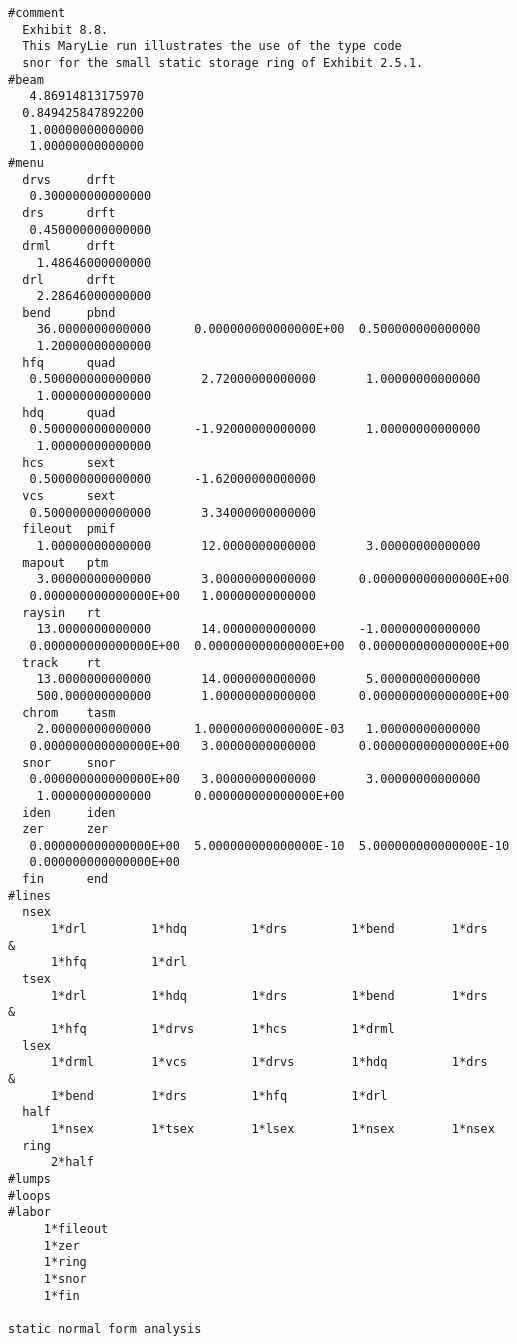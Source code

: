 \vspace{5mm}
\begin{footnotesize}
\begin{verbatim}
#comment
  Exhibit 8.8.
  This MaryLie run illustrates the use of the type code
  snor for the small static storage ring of Exhibit 2.5.1.
#beam
   4.86914813175970
  0.849425847892200
   1.00000000000000
   1.00000000000000
#menu
  drvs     drft
   0.300000000000000
  drs      drft
   0.450000000000000
  drml     drft
    1.48646000000000
  drl      drft
    2.28646000000000
  bend     pbnd
    36.0000000000000      0.000000000000000E+00  0.500000000000000
    1.20000000000000
  hfq      quad
   0.500000000000000       2.72000000000000       1.00000000000000
    1.00000000000000
  hdq      quad
   0.500000000000000      -1.92000000000000       1.00000000000000
    1.00000000000000
  hcs      sext
   0.500000000000000      -1.62000000000000
  vcs      sext
   0.500000000000000       3.34000000000000
  fileout  pmif
    1.00000000000000       12.0000000000000       3.00000000000000
  mapout   ptm
    3.00000000000000       3.00000000000000      0.000000000000000E+00
   0.000000000000000E+00   1.00000000000000
  raysin   rt
    13.0000000000000       14.0000000000000      -1.00000000000000
   0.000000000000000E+00  0.000000000000000E+00  0.000000000000000E+00
  track    rt
    13.0000000000000       14.0000000000000       5.00000000000000
    500.000000000000       1.00000000000000      0.000000000000000E+00
  chrom    tasm
    2.00000000000000      1.000000000000000E-03   1.00000000000000
   0.000000000000000E+00   3.00000000000000      0.000000000000000E+00
  snor     snor
   0.000000000000000E+00   3.00000000000000       3.00000000000000
    1.00000000000000      0.000000000000000E+00
  iden     iden
  zer      zer
   0.000000000000000E+00  5.000000000000000E-10  5.000000000000000E-10
   0.000000000000000E+00
  fin      end
#lines
  nsex
      1*drl         1*hdq         1*drs         1*bend        1*drs      &
      1*hfq         1*drl
  tsex
      1*drl         1*hdq         1*drs         1*bend        1*drs      &
      1*hfq         1*drvs        1*hcs         1*drml
  lsex
      1*drml        1*vcs         1*drvs        1*hdq         1*drs      &
      1*bend        1*drs         1*hfq         1*drl
  half
      1*nsex        1*tsex        1*lsex        1*nsex        1*nsex
  ring
      2*half
#lumps
#loops
#labor
     1*fileout
     1*zer
     1*ring
     1*snor
     1*fin

static normal form analysis


\end{verbatim}
\end{footnotesize}

